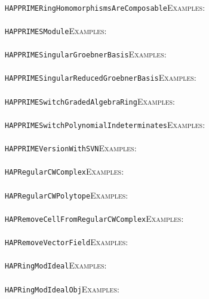 \documentclass[a4paper,11pt]{report}
\begin{document}
{{ \\
 \texttt{HAPPRIME{\textunderscore}RingHomomorphismsAreComposable}{\nobreakspace}{\nobreakspace}{\nobreakspace}{\nobreakspace}\textsc{Examples:} \\
 \\
 \texttt{HAPPRIME{\textunderscore}SModule}{\nobreakspace}{\nobreakspace}{\nobreakspace}{\nobreakspace}\textsc{Examples:} \\
 \\
 \texttt{HAPPRIME{\textunderscore}SingularGroebnerBasis}{\nobreakspace}{\nobreakspace}{\nobreakspace}{\nobreakspace}\textsc{Examples:} \\
 \\
 \texttt{HAPPRIME{\textunderscore}SingularReducedGroebnerBasis}{\nobreakspace}{\nobreakspace}{\nobreakspace}{\nobreakspace}\textsc{Examples:} \\
 \\
 \texttt{HAPPRIME{\textunderscore}SwitchGradedAlgebraRing}{\nobreakspace}{\nobreakspace}{\nobreakspace}{\nobreakspace}\textsc{Examples:} \\
 \\
 \texttt{HAPPRIME{\textunderscore}SwitchPolynomialIndeterminates}{\nobreakspace}{\nobreakspace}{\nobreakspace}{\nobreakspace}\textsc{Examples:} \\
 \\
 \texttt{HAPPRIME{\textunderscore}VersionWithSVN}{\nobreakspace}{\nobreakspace}{\nobreakspace}{\nobreakspace}\textsc{Examples:} \\
 \\
 \texttt{HAPRegularCWComplex}{\nobreakspace}{\nobreakspace}{\nobreakspace}{\nobreakspace}\textsc{Examples:} \\
 \\
 \texttt{HAPRegularCWPolytope}{\nobreakspace}{\nobreakspace}{\nobreakspace}{\nobreakspace}\textsc{Examples:} \\
 \\
 \texttt{HAPRemoveCellFromRegularCWComplex}{\nobreakspace}{\nobreakspace}{\nobreakspace}{\nobreakspace}\textsc{Examples:} \\
 \\
 \texttt{HAPRemoveVectorField}{\nobreakspace}{\nobreakspace}{\nobreakspace}{\nobreakspace}\textsc{Examples:} \\
 \\
 \texttt{HAPRingModIdeal}{\nobreakspace}{\nobreakspace}{\nobreakspace}{\nobreakspace}\textsc{Examples:} \\
 \\
 \texttt{HAPRingModIdealObj}{\nobreakspace}{\nobreakspace}{\nobreakspace}{\nobreakspace}\textsc{Examples:} \\
}}
\end{document}

